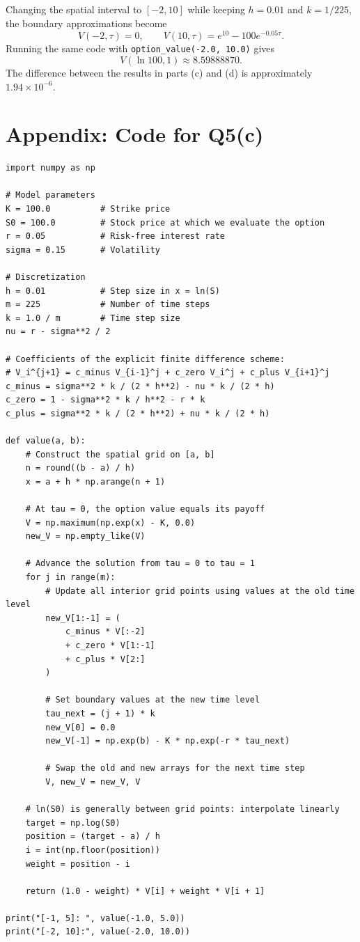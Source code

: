 \documentclass{article}
\begin{document}
Changing the spatial interval to \([-2,10]\) while keeping
\(h=0.01\) and \(k=1/225\), the boundary approximations become
\[
V(-2,\tau)=0,\qquad
V(10,\tau)=e^{10}-100e^{-0.05\tau}.
\]
Running the same code with
\texttt{option\_value(-2.0, 10.0)} gives
\[
\boxed{V(\ln100,1)\approx 8.59888870.}
\]
The difference between the results in parts (c) and (d) is
approximately \(1.94\times10^{-6}\).

\newpage
\section*{Appendix: Code for Q5(c)}
\small
\begin{verbatim}
import numpy as np

# Model parameters
K = 100.0          # Strike price
S0 = 100.0         # Stock price at which we evaluate the option
r = 0.05           # Risk-free interest rate
sigma = 0.15       # Volatility

# Discretization
h = 0.01           # Step size in x = ln(S)
m = 225            # Number of time steps
k = 1.0 / m        # Time step size
nu = r - sigma**2 / 2

# Coefficients of the explicit finite difference scheme:
# V_i^{j+1} = c_minus V_{i-1}^j + c_zero V_i^j + c_plus V_{i+1}^j
c_minus = sigma**2 * k / (2 * h**2) - nu * k / (2 * h)
c_zero = 1 - sigma**2 * k / h**2 - r * k
c_plus = sigma**2 * k / (2 * h**2) + nu * k / (2 * h)

def value(a, b):
    # Construct the spatial grid on [a, b]
    n = round((b - a) / h)
    x = a + h * np.arange(n + 1)

    # At tau = 0, the option value equals its payoff
    V = np.maximum(np.exp(x) - K, 0.0)
    new_V = np.empty_like(V)

    # Advance the solution from tau = 0 to tau = 1
    for j in range(m):
        # Update all interior grid points using values at the old time level
        new_V[1:-1] = (
            c_minus * V[:-2]
            + c_zero * V[1:-1]
            + c_plus * V[2:]
        )

        # Set boundary values at the new time level
        tau_next = (j + 1) * k
        new_V[0] = 0.0
        new_V[-1] = np.exp(b) - K * np.exp(-r * tau_next)

        # Swap the old and new arrays for the next time step
        V, new_V = new_V, V

    # ln(S0) is generally between grid points: interpolate linearly
    target = np.log(S0)
    position = (target - a) / h
    i = int(np.floor(position))
    weight = position - i

    return (1.0 - weight) * V[i] + weight * V[i + 1]

print("[-1, 5]: ", value(-1.0, 5.0))
print("[-2, 10]:", value(-2.0, 10.0))
\end{verbatim}
\end{document}
